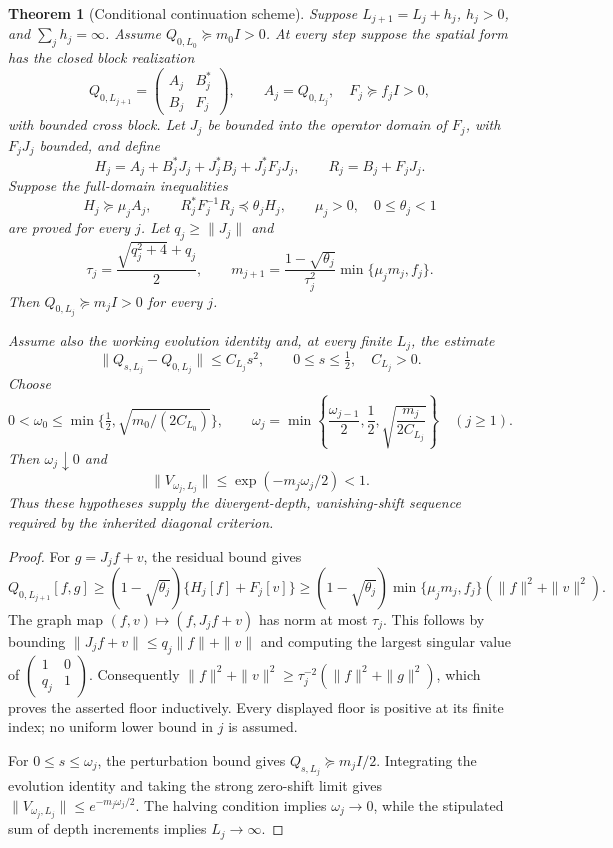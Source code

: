 \documentclass[11pt]{article}
\newtheorem{theorem}{Theorem}[section]
\theoremstyle{remark}\newtheorem{remark}[theorem]{Remark}
\begin{document}
\begin{theorem}[Conditional continuation scheme]
\label{thm:conditional-continuation}
Suppose \(L_{j+1}=L_j+h_j\), \(h_j>0\), and \(\sum_jh_j=\infty\).
Assume \(Q_{0,L_0}\succeq m_0I>0\). At every step suppose the spatial form
has the closed block realization
\[
 Q_{0,L_{j+1}}=
 \begin{pmatrix}A_j&B_j^*\\B_j&F_j\end{pmatrix},
 \qquad A_j=Q_{0,L_j},\quad F_j\succeq f_j I>0,
\]
with bounded cross block. Let \(J_j\) be bounded into the operator domain of
\(F_j\), with \(F_jJ_j\) bounded, and define
\[
 H_j=A_j+B_j^*J_j+J_j^*B_j+J_j^*F_jJ_j,
 \qquad R_j=B_j+F_jJ_j.
\]
Suppose the full-domain inequalities
\begin{equation}\label{eq:induction-premises}
 H_j\succeq\mu_jA_j,
 \qquad R_j^*F_j^{-1}R_j\preceq\theta_jH_j,
 \qquad \mu_j>0,\quad0\le\theta_j<1
\end{equation}
are proved for every \(j\). Let \(q_j\ge\|J_j\|\) and
\[
 \tau_j=\frac{\sqrt{q_j^2+4}+q_j}{2},\qquad
 m_{j+1}=\frac{1-\sqrt{\theta_j}}{\tau_j^2}
                 \min\{\mu_jm_j,f_j\}.
\]
Then \(Q_{0,L_j}\succeq m_jI>0\) for every \(j\).

Assume also the working evolution identity and, at every finite \(L_j\),
the estimate
\[
 \|Q_{s,L_j}-Q_{0,L_j}\|\le C_{L_j}s^2,
 \qquad 0\le s\le\tfrac12,\quad C_{L_j}>0.
\]
Choose
\[
 0<\omega_0\le\min\{\tfrac12,\sqrt{m_0/(2C_{L_0})}\},
 \qquad
 \omega_j=\min\left\{\frac{\omega_{j-1}}2,
                       \frac12,\sqrt{\frac{m_j}{2C_{L_j}}}\right\}
 \quad(j\ge1).
\]
Then \(\omega_j\downarrow0\) and
\[
 \|V_{\omega_j,L_j}\|\le\exp(-m_j\omega_j/2)<1.
\]
Thus these hypotheses supply the divergent-depth, vanishing-shift sequence
required by the inherited diagonal criterion.
\end{theorem}

\begin{proof}
For \(g=J_jf+v\), the residual bound gives
\[
 Q_{0,L_{j+1}}[f,g]
 \ge(1-\sqrt{\theta_j})\{H_j[f]+F_j[v]\}
 \ge(1-\sqrt{\theta_j})\min\{\mu_jm_j,f_j\}
                (\|f\|^2+\|v\|^2).
\]
The graph map \((f,v)\mapsto(f,J_jf+v)\) has norm at most \(\tau_j\).
This follows by bounding \(\|J_jf+v\|\le q_j\|f\|+\|v\|\) and computing
the largest singular value of
\(\left(\begin{smallmatrix}1&0\\q_j&1\end{smallmatrix}\right)\).
Consequently
\(\|f\|^2+\|v\|^2\ge\tau_j^{-2}(\|f\|^2+\|g\|^2)\),
which proves the asserted floor inductively. Every displayed floor is
positive at its finite index; no uniform lower bound in \(j\) is assumed.

For \(0\le s\le\omega_j\), the perturbation bound gives
\(Q_{s,L_j}\succeq m_jI/2\). Integrating the evolution identity and taking
the strong zero-shift limit gives
\(\|V_{\omega_j,L_j}\|\le e^{-m_j\omega_j/2}\).
The halving condition implies \(\omega_j\to0\), while the stipulated sum
of depth increments implies \(L_j\to\infty\).
\end{proof}
\end{document}
